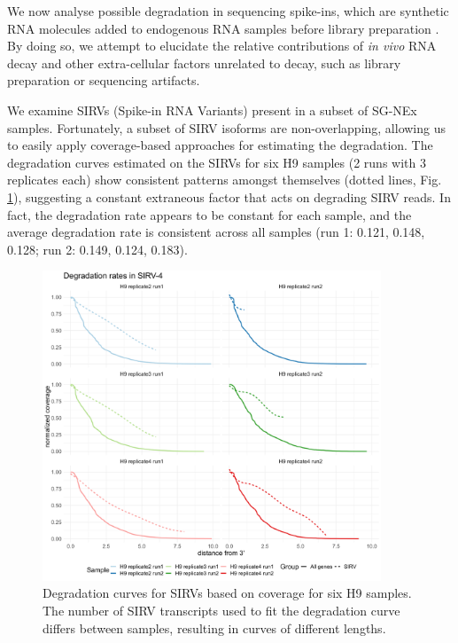 We now analyse possible degradation in sequencing spike-ins, which are synthetic RNA molecules added to endogenous RNA samples before library preparation \cite{Lexogen20201}. By doing so, we attempt to elucidate the relative contributions of \textit{in vivo} RNA decay and other extra-cellular factors unrelated to decay, such as library preparation or sequencing artifacts.

We examine SIRVs (Spike-in RNA Variants) \cite{Lexogen20201} present in a subset of SG-NEx samples. Fortunately, a subset of SIRV isoforms are non-overlapping, allowing us to easily apply coverage-based approaches for estimating the degradation. The degradation curves estimated on the SIRVs for six H9 samples (2 runs with 3 replicates each) show consistent patterns amongst themselves (dotted lines, Fig. \ref{fig:cov-spike}), suggesting a constant extraneous factor that acts on degrading SIRV reads. In fact, the degradation rate appears to be constant for each sample, and the average degradation rate is consistent across all samples (run 1: 0.121, 0.148, 0.128; run 2: 0.149, 0.124, 0.183). 

\begin{figure}[H]
    \centering
    \includegraphics[width=0.9\textwidth]{figures/sec-2-cov-spike.png}
    \caption[Degradation curves for SIRVs based on coverage]{Degradation curves for SIRVs based on coverage for six H9 samples. The number of SIRV transcripts used to fit the degradation curve differs between samples, resulting in curves of different lengths.}
    \label{fig:cov-spike}
\end{figure}

